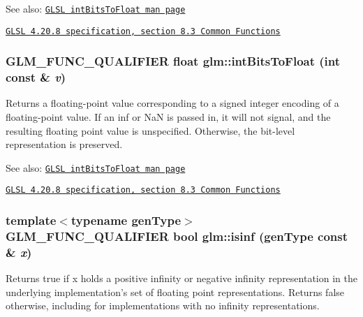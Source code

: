 \begin{Desc}
\item[See also:]\href{http://www.opengl.org/sdk/docs/manglsl/xhtml/intBitsToFloat.xml}{\tt GLSL intBitsToFloat man page} 

\href{http://www.opengl.org/registry/doc/GLSLangSpec.4.20.8.pdf}{\tt GLSL 4.20.8 specification, section 8.3 Common Functions} \end{Desc}
\hypertarget{group__core__func__common_g2650dc57b2148a6ffbce20944fb4d97a}{
\subsubsection[intBitsToFloat]{\setlength{\rightskip}{0pt plus 5cm}GLM\_\-FUNC\_\-QUALIFIER float glm::intBitsToFloat (int const \& {\em v})}}
\label{group__core__func__common_g2650dc57b2148a6ffbce20944fb4d97a}


Returns a floating-point value corresponding to a signed integer encoding of a floating-point value. If an inf or NaN is passed in, it will not signal, and the resulting floating point value is unspecified. Otherwise, the bit-level representation is preserved.

\begin{Desc}
\item[See also:]\href{http://www.opengl.org/sdk/docs/manglsl/xhtml/intBitsToFloat.xml}{\tt GLSL intBitsToFloat man page} 

\href{http://www.opengl.org/registry/doc/GLSLangSpec.4.20.8.pdf}{\tt GLSL 4.20.8 specification, section 8.3 Common Functions} \end{Desc}
\hypertarget{group__core__func__common_g9ab92804679f33124bd9575da9ac6a3a}{
\subsubsection[isinf]{\setlength{\rightskip}{0pt plus 5cm}template$<$typename genType$>$ GLM\_\-FUNC\_\-QUALIFIER bool glm::isinf (genType const \& {\em x})}}
\label{group__core__func__common_g9ab92804679f33124bd9575da9ac6a3a}


Returns true if x holds a positive infinity or negative infinity representation in the underlying implementation's set of floating point representations. Returns false otherwise, including for implementations with no infinity representations.

